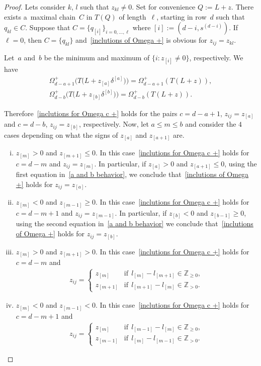 \documentclass[pdftex]{sigma}
\numberwithin{equation}{section}
\begin{document}
\begin{proof}
Lets consider $k$, $l$ such that $z_{kl}\neq 0$.
Set for convenience $Q:=L+z$.
There exists a~maximal chain~$C$ in $T(Q)$ of length~$\ell$, starting in row~$d$ such that $q_{kl}\in C$.
Suppose that $C=\{q_{[i]}\}_{i=0,\ldots,\ell}$ where $[i]:=(d-i,s^{(d-i)})$.
If $\ell=0$, then $C=\{q_{kl}\}$ and~\eqref{inclutions of Omega +} is obvious for $z_{ij}=z_{kl}$.

Let~$a$ and~$b$ be the minimum and maximum of $\{i:z_{[i]}\neq 0\}$, respectively.
We have
\begin{gather}
\Omega^{+}_{d-a+1}\big(T\big(L+z_{[a]}\delta^{[a]}\big)\big)=\Omega^{+}_{d-a+1}(T(L+z)),\nonumber
\\
\Omega^{+}_{d-b}\big(T\big(L+z_{[b]}\delta^{[b]}\big)\big)=\Omega^{+}_{d-b}(T(L+z)).\label{a and b behavior}
\end{gather}

Therefore~\eqref{inclutions for Omega c +} holds for the pairs $c=d-a+1$, $z_{ij}=z_{[a]}$ and $c=d-b$, $z_{ij}=z_{[b]}$,
respectively.
Now, let $a\leq m\leq b$ and consider the $4$ cases depending on what the signs of $z_{[a]}$ and $z_{[a+1]}$ are.
\begin{enumerate}[(i)]\itemsep=0pt
\item $z_{[m]}>0$ and $z_{[m+1]}\leq 0$.
In this case~\eqref{inclutions for Omega c +} holds for $c=d-m$ and $z_{ij}=z_{[m]}$.
In particular, if $z_{[a]}>0$ and $z_{[a+1]}\leq 0$, using the f\/irst equation in~\eqref{a and b behavior}, we conclude
that~\eqref{inclutions of Omega +} holds for $z_{ij}=z_{[a]}$.
\item $z_{[m]}<0$ and $z_{[m-1]}\geq 0$.
In this case~\eqref{inclutions for Omega c +} holds for $c=d-m+1$ and $z_{ij}=z_{[m-1]}$.
In particular, if $z_{[b]}<0$ and $z_{[b-1]}\geq 0$, using the second equation in~\eqref{a and b behavior} we conclude
that~\eqref{inclutions of Omega +} holds for $z_{ij}=z_{[b]}$.
\item $z_{[m]}>0$ and $z_{[m+1]}> 0$.
In this case~\eqref{inclutions for Omega c +} holds for $c=d-m$ and
\begin{gather*}
z_{ij}=
\begin{cases}
z_{[m]} & \text{if} \ \ l_{[m]}-l_{[m+1]}\in\mathbb{Z}_{\geq 0},
\\
z_{[m+1]} & \text{if} \ \ l_{[m+1]}-l_{[m]}\in\mathbb{Z}_{> 0}.
\end{cases}
\end{gather*}
\item $z_{[m]}<0$ and $z_{[m-1]}< 0$.
In this case~\eqref{inclutions for Omega c +} holds for $c=d-m+1$ and
\begin{gather*}
z_{ij}=
\begin{cases}
z_{[m]} & \text{if} \ \  l_{[m-1]}-l_{[m]}\in\mathbb{Z}_{\geq 0},
\\
z_{[m-1]} & \text{if} \ \ l_{[m]}-l_{[m-1]}\in\mathbb{Z}_{> 0}.
\end{cases}
\end{gather*}
\end{enumerate}


\end{proof}
\end{document}
